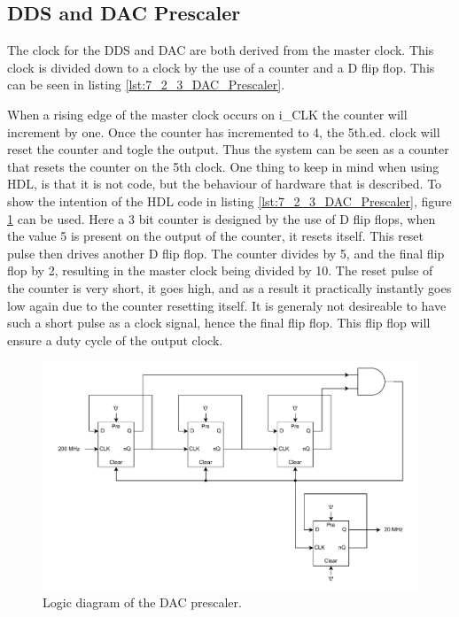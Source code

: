 \subsection*{DDS and DAC Prescaler}
The clock for the DDS and DAC are both derived from the  master clock. This clock is divided down to a  clock by the use of a counter and a D flip flop. This can be seen in listing \ref{lst:7_2_3_DAC_Prescaler}. 



When a rising edge of the master clock occurs on i\_CLK the counter will increment by one. Once the counter has incremented to 4, the 5th.ed. clock will reset the counter and togle the output. Thus the system can be seen as a counter that resets the counter on the 5th clock. One thing to keep in mind when using HDL, is that it is not code, but the behaviour of hardware that is described. To show the intention of the HDL code in listing \ref{lst:7_2_3_DAC_Prescaler}, figure \ref{fig:7_2_3_DAC_PRESCALER_LOGIC} can be used. Here a 3 bit counter is designed by the use of D flip flops, when the value 5 is present on the output of the counter, it resets itself. This reset pulse then drives another D flip flop. The counter divides by 5, and the final flip flop by 2, resulting in the master clock being divided by 10. The reset pulse of the counter is very short, it goes high, and as a result it practically instantly goes low again due to the counter resetting itself. It is generaly not desireable to have such a short pulse as a clock signal, hence the final flip flop. This flip flop will ensure a  duty cycle of the output clock.

\begin{figure}[H]
    \centering
    \includegraphics[clip, trim=0 0 0 0, width=1\textwidth]{Sections/7_SystemDesign/Figures/DAC_PRESCALER_LOGIC.pdf}
    \caption{Logic diagram of the DAC prescaler.}
    \label{fig:7_2_3_DAC_PRESCALER_LOGIC}
\end{figure}



